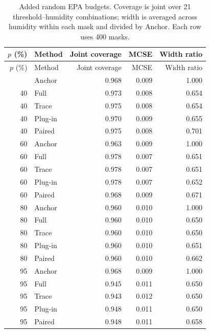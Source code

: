 \begin{longtable}{rlrrr}
\caption{Added random EPA budgets. Coverage is joint over 21 threshold--humidity combinations; width is averaged across humidity within each mask and divided by Anchor. Each row uses 400 masks.}\label{tab:s10-epa}\\
\toprule $p$ (\%) & Method & Joint coverage & MCSE & Width ratio \\\midrule\endfirsthead
\toprule $p$ (\%) & Method & Joint coverage & MCSE & Width ratio \\\midrule\endhead
\bottomrule\endfoot
40 & Anchor & 0.968 & 0.009 & 1.000 \\
40 & Full & 0.973 & 0.008 & 0.654 \\
40 & Trace & 0.975 & 0.008 & 0.654 \\
40 & Plug-in & 0.970 & 0.009 & 0.655 \\
40 & Paired & 0.975 & 0.008 & 0.701 \\
60 & Anchor & 0.963 & 0.009 & 1.000 \\
60 & Full & 0.978 & 0.007 & 0.651 \\
60 & Trace & 0.978 & 0.007 & 0.651 \\
60 & Plug-in & 0.978 & 0.007 & 0.652 \\
60 & Paired & 0.968 & 0.009 & 0.671 \\
80 & Anchor & 0.960 & 0.010 & 1.000 \\
80 & Full & 0.960 & 0.010 & 0.650 \\
80 & Trace & 0.960 & 0.010 & 0.650 \\
80 & Plug-in & 0.960 & 0.010 & 0.651 \\
80 & Paired & 0.960 & 0.010 & 0.662 \\
95 & Anchor & 0.968 & 0.009 & 1.000 \\
95 & Full & 0.945 & 0.011 & 0.650 \\
95 & Trace & 0.943 & 0.012 & 0.650 \\
95 & Plug-in & 0.948 & 0.011 & 0.650 \\
95 & Paired & 0.948 & 0.011 & 0.658 \\
\end{longtable}
